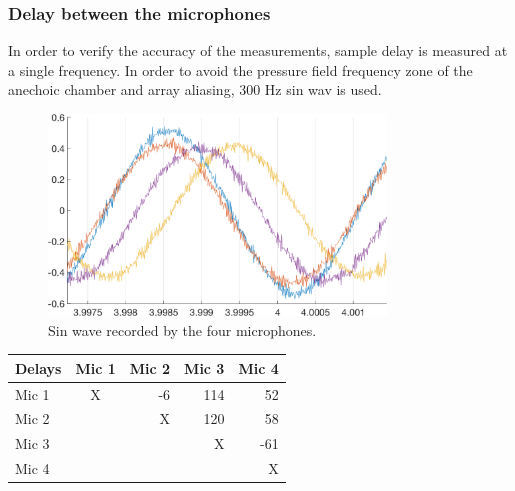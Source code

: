 
 
\subsubsection{Delay between the microphones}
 
 In order to verify the accuracy of the measurements, sample delay is measured at a single frequency. In order to avoid the pressure field frequency zone of the anechoic chamber and array aliasing, 300 Hz sin wav is used. 
 
 \begin{figure}[H]
    \centering
    \includegraphics[width=0.8\textwidth]{Figures/delaytetra300Hz.png}
    \caption{Sin wave recorded by the four microphones.}
    \label{fig:pinknoise}
\end{figure}
 
 
\begin{center}
  \begin{tabular}{ | l | c | r | r | r |}
    \hline
    Delays & Mic 1 & Mic 2 & Mic 3 & Mic 4 \\ \hline
    Mic 1 & X & -6&114 & 52  \\ \hline
    Mic 2 &   & X &120 & 58  \\ \hline
    Mic 3 &   &   & X  &-61  \\ \hline
    Mic 4 &   &   &    & X   \\ \hline
  \end{tabular}
\end{center}

 
